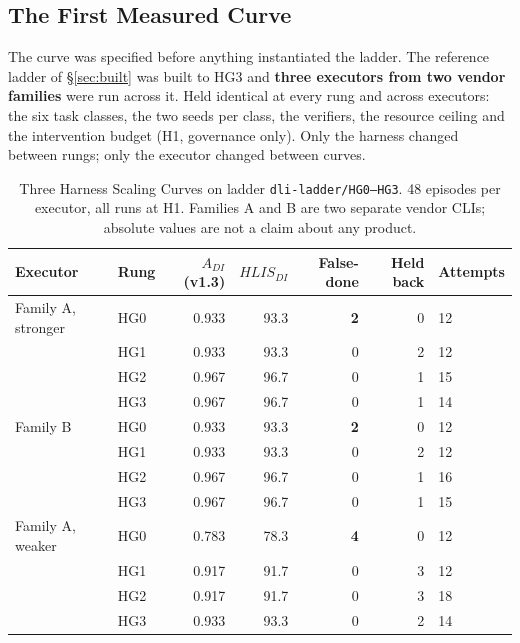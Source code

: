 \documentclass[11pt]{article}
\theoremstyle{definition}
\begin{document}
\subsection{The First Measured Curve}\label{sec:measured}

The curve was specified before anything instantiated the ladder. The reference ladder of \S\ref{sec:built} was built to HG3 and \textbf{three executors from two vendor families} were run across it. Held identical at every rung and across executors: the six task classes, the two seeds per class, the verifiers, the resource ceiling and the intervention budget (H1, governance only). Only the harness changed between rungs; only the executor changed between curves.

\begin{table}[h]
\centering\small
\begin{tabularx}{\textwidth}{@{}p{}lrrrrY@{}}
\toprule
Executor & Rung & $A_{DI}$ (v1.3) & $HLIS_{DI}$ & False-done & Held back & Attempts \\
\midrule
Family A, stronger & HG0 & 0.933 & 93.3 & \textbf{2} & 0 & 12 \\
                   & HG1 & 0.933 & 93.3 & 0 & 2 & 12 \\
                   & HG2 & 0.967 & 96.7 & 0 & 1 & 15 \\
                   & HG3 & 0.967 & 96.7 & 0 & 1 & 14 \\
\midrule
Family B & HG0 & 0.933 & 93.3 & \textbf{2} & 0 & 12 \\
         & HG1 & 0.933 & 93.3 & 0 & 2 & 12 \\
         & HG2 & 0.967 & 96.7 & 0 & 1 & 16 \\
         & HG3 & 0.967 & 96.7 & 0 & 1 & 15 \\
\midrule
Family A, weaker & HG0 & 0.783 & 78.3 & \textbf{4} & 0 & 12 \\
                 & HG1 & 0.917 & 91.7 & 0 & 3 & 12 \\
                 & HG2 & 0.917 & 91.7 & 0 & 3 & 18 \\
                 & HG3 & 0.933 & 93.3 & 0 & 2 & 14 \\
\bottomrule
\end{tabularx}
\caption{Three Harness Scaling Curves on ladder \texttt{dli-ladder/HG0--HG3}. 48 episodes per executor, all runs at H1. Families A and B are two separate vendor CLIs; absolute values are not a claim about any product.}
\end{table}
\end{document}
